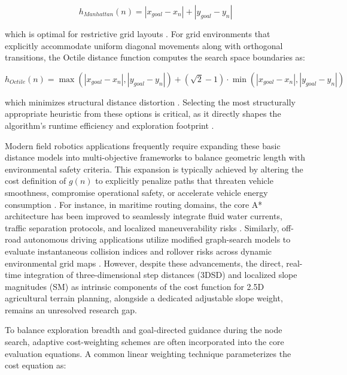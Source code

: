 \begin{equation}
    h_{Manhattan}(n) = |x_{goal} - x_n| + |y_{goal} - y_n|
\end{equation}

\noindent which is optimal for restrictive grid layouts \citep{Karur_2021_surveypath}. For grid environments that explicitly accommodate uniform diagonal movements along with orthogonal transitions, the Octile distance function computes the search space boundaries as:

\begin{equation}
    h_{Octile}(n) = \max(|x_{goal} - x_n|, |y_{goal} - y_n|) + (\sqrt{2} - 1) \cdot \min(|x_{goal} -
x_n|, |y_{goal} - y_n|)
\end{equation}

\noindent which minimizes structural distance distortion \citep{Karur_2021_surveypath}. Selecting the most structurally appropriate heuristic from these options is critical, as it directly shapes the algorithm's runtime efficiency and exploration footprint \citep{Yao_2010_pathplanning}.

Modern field robotics applications frequently require expanding these basic distance models into
multi-objective frameworks to balance geometric length with environmental safety criteria. This
expansion is typically achieved by altering the cost definition of $g(n)$ to explicitly penalize
paths that threaten vehicle smoothness, compromise operational safety, or accelerate vehicle energy
consumption \citep{Cheng_2014_improvedhierarchical, Nazarahari_2019_multiobjectivemultirobot, Ducho_2014_pathplanning}. For instance, in maritime routing domains, the core A*
architecture has been improved to seamlessly integrate fluid water currents, traffic separation
protocols, and localized maneuverability risks \citep{Zhuang_2019_improvedastar}. Similarly, off-road autonomous driving
applications utilize modified graph-search models to evaluate instantaneous collision indices and
rollover risks across dynamic environmental grid maps \citep{Li_2019_rolloverfreepath}. However, despite these
advancements, the direct, real-time integration of three-dimensional step distances (3DSD) and
localized slope magnitudes (SM) as intrinsic components of the cost function for 2.5D agricultural
terrain planning, alongside a dedicated adjustable slope weight, remains an unresolved research gap.

To balance exploration breadth and goal-directed guidance during the node search, adaptive
cost-weighting schemes are often incorporated into the core evaluation equations. A common linear
weighting technique parameterizes the cost equation as:

